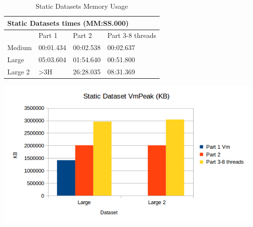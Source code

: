 \documentclass[12pt]{article}
\begin{document}
\begin{table}[H]
\caption{Static Datasets Memory Usage}
\begin{minipage}{.5\textwidth}
\centering
\footnotesize
\tabcolsep=0.11cm
\label{sdm}
\begin{tabular}{|l|l|l|l|}
\hline
\multicolumn{4}{|l|}{Static Datasets times (MM:SS.000)} \\ \hline
        & Part 1         & Part 2    & Part 3-8 threads \\ \hline
Medium  & 00:01.434      & 00:02.538 & 00:02.637        \\ \hline
Large   & 05:03.604      & 01:54.640 & 00:51.800        \\ \hline
Large 2 & \textgreater3H & 26:28.035 & 08:31.369        \\ \hline
\end{tabular}
\end{minipage}%
\begin{minipage}{.5\textwidth}
\includegraphics[scale=0.5]{StaticDatasets_VmPeak.png}
\end{minipage}%
\end{table}
\end{document}
